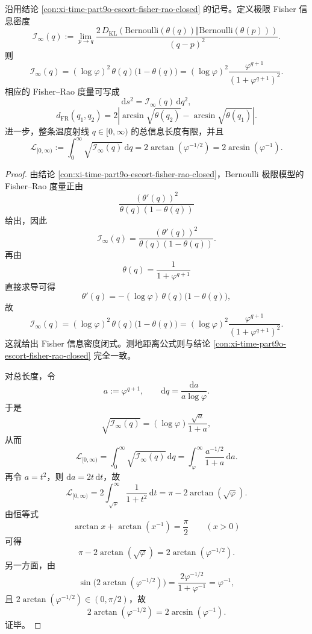\begin{theorem}\label{thm:xi-time-part9ob-escort-fisher-total-length}
沿用结论 \ref{con:xi-time-part9o-escort-fisher-rao-closed} 的记号。定义极限 Fisher 信息密度
\[
\mathcal I_\infty(q)
:=
\lim_{p\to q}
\frac{2\,D_{\mathrm{KL}}(\mathrm{Bernoulli}(\theta(q))\Vert \mathrm{Bernoulli}(\theta(p)))}{(q-p)^2}.
\]
则
\[
\boxed{\;
\mathcal I_\infty(q)
=
(\log\varphi)^2\,\theta(q)\bigl(1-\theta(q)\bigr)
=
(\log\varphi)^2\frac{\varphi^{q+1}}{(1+\varphi^{q+1})^2}.\;}
\]
相应的 Fisher--Rao 度量可写成
\[
\mathrm ds^2=\mathcal I_\infty(q)\,\mathrm dq^2,
\]
\[
d_{\mathrm{FR}}(q_1,q_2)
=
2\left|
\arcsin\sqrt{\theta(q_2)}-\arcsin\sqrt{\theta(q_1)}
\right|.
\]
进一步，整条温度射线 \(q\in[0,\infty)\) 的总信息长度有限，并且
\[
\mathcal L_{[0,\infty)}
:=
\int_0^\infty \sqrt{\mathcal I_\infty(q)}\,\mathrm dq
=
2\arctan(\varphi^{-1/2})
=
2\arcsin(\varphi^{-1}).
\]
\end{theorem}
\begin{proof}
由结论 \ref{con:xi-time-part9o-escort-fisher-rao-closed}，Bernoulli 极限模型的 Fisher--Rao 度量正由
\[
\frac{(\theta'(q))^2}{\theta(q)(1-\theta(q))}
\]
给出，因此
\[
\mathcal I_\infty(q)
=
\frac{(\theta'(q))^2}{\theta(q)(1-\theta(q))}.
\]
再由
\[
\theta(q)=\frac{1}{1+\varphi^{q+1}}
\]
直接求导可得
\[
\theta'(q)
=
-(\log\varphi)\,\theta(q)\bigl(1-\theta(q)\bigr),
\]
故
\[
\mathcal I_\infty(q)
=(\log\varphi)^2\,\theta(q)\bigl(1-\theta(q)\bigr)
=(\log\varphi)^2\frac{\varphi^{q+1}}{(1+\varphi^{q+1})^2}.
\]
这就给出 Fisher 信息密度闭式。测地距离公式则与结论 \ref{con:xi-time-part9o-escort-fisher-rao-closed} 完全一致。

对总长度，令
\[
a:=\varphi^{q+1},
\qquad
\mathrm dq=\frac{\mathrm da}{a\log\varphi}.
\]
于是
\[
\sqrt{\mathcal I_\infty(q)}
=(\log\varphi)\frac{\sqrt a}{1+a},
\]
从而
\[
\mathcal L_{[0,\infty)}
=
\int_0^\infty \sqrt{\mathcal I_\infty(q)}\,\mathrm dq
=
\int_{\varphi}^{\infty}\frac{a^{-1/2}}{1+a}\,\mathrm da.
\]
再令 \(a=t^2\)，则 \(\mathrm da=2t\,\mathrm dt\)，故
\[
\mathcal L_{[0,\infty)}
=
2\int_{\sqrt\varphi}^{\infty}\frac{1}{1+t^2}\,\mathrm dt
=
\pi-2\arctan(\sqrt\varphi).
\]
由恒等式
\[
\arctan x+\arctan(x^{-1})=\frac{\pi}{2}
\qquad (x>0)
\]
可得
\[
\pi-2\arctan(\sqrt\varphi)=2\arctan(\varphi^{-1/2}).
\]
另一方面，由
\[
\sin\!\bigl(2\arctan(\varphi^{-1/2})\bigr)
=
\frac{2\varphi^{-1/2}}{1+\varphi^{-1}}
=
\varphi^{-1},
\]
且 \(2\arctan(\varphi^{-1/2})\in(0,\pi/2)\)，故
\[
2\arctan(\varphi^{-1/2})=2\arcsin(\varphi^{-1}).
\]
证毕。
\end{proof}

